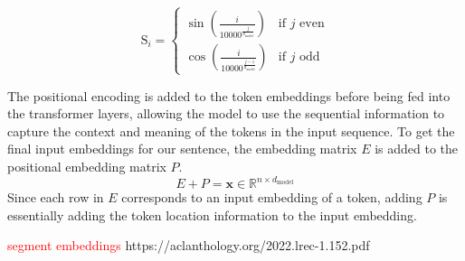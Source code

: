 $$ \text{S}_{i} =
\begin{cases}
\sin\left(\frac{i}{10000^\frac{j}{d_{\text{model}}}}\right)
& \text{if } j \text{ even} \\
\cos\left(\frac{i}{10000^\frac{j-1}{d_{\text{model}}}}\right)
& \text{if } j \text{ odd}
\end{cases} $$

The positional encoding is added to the token embeddings before being fed into the transformer layers, allowing the model to use the sequential information to capture the context and meaning of the tokens in the input sequence. 
To get the final input embeddings for our sentence, the embedding matrix $E$ is added to the positional embedding matrix $P$. 
$$E + P = \textbf{x} \in  \mathbb{R}^{n \times d_{\text{model}}}$$
Since each row in $E$ corresponds to an input embedding of a token, adding $P$ is essentially adding the token location information to the input embedding.

\textcolor{red}{segment embeddings}
https://aclanthology.org/2022.lrec-1.152.pdf
